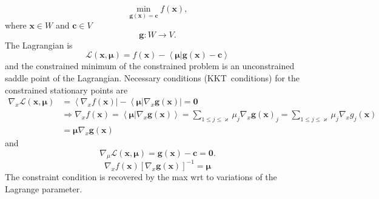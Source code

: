 \documentclass[aps,preprint]{revtex4}%
\begin{document}
\begin{equation}
\min_{\boldsymbol{g}\left(  \boldsymbol{x}\right)  =\boldsymbol{c}}f\left(
\boldsymbol{x}\right)  ,
\end{equation}
where $\boldsymbol{x\in}W$ and $\boldsymbol{c\in}V$
\[
\boldsymbol{g:}W\rightarrow V.
\]
The Lagrangian is%
\begin{equation}
\mathcal{L}\left(  \boldsymbol{x,\mu}\right)  =f\left(  \boldsymbol{x}\right)
-\left\langle \boldsymbol{\mu}\left\vert \boldsymbol{g}\left(  \boldsymbol{x}%
\right)  -\boldsymbol{c}\right.  \right\rangle
\end{equation}
and the constrained minimum of the constrained problem is an unconstrained
saddle point of the Lagrangian. Necessary conditions (KKT\ conditions) for the
constrained stationary points are
\begin{align}
\nabla_{x}\mathcal{L}\left(  \boldsymbol{x,\mu}\right)   &  =\left\langle
\nabla_{x}f\left(  \boldsymbol{x}\right)  \right\vert -\left\langle
\boldsymbol{\mu}\left\vert \nabla_{x}\boldsymbol{g}\left(  \boldsymbol{x}%
\right)  \right.  \right\vert =\boldsymbol{0}\\
&  \Rightarrow\nabla_{x}f\left(  \boldsymbol{x}\right)  =\left\langle
\boldsymbol{\mu}\left\vert \nabla_{x}\boldsymbol{g}\left(  \boldsymbol{x}%
\right)  \right.  \right\rangle =\sum_{1\leq j\leq\varkappa}\mu_{j}\nabla
_{x}\boldsymbol{g}\left(  \boldsymbol{x}\right)  _{j}=\sum_{1\leq
j\leq\varkappa}\mu_{j}\nabla_{x}g_{j}\left(  \boldsymbol{x}\right)  \\
&  =\boldsymbol{\mu}\nabla_{x}\boldsymbol{g}\left(  \boldsymbol{x}\right)
\end{align}
and
\begin{equation}
\nabla_{\mu}\mathcal{L}\left(  \boldsymbol{x,\mu}\right)  =\boldsymbol{g}%
\left(  \boldsymbol{x}\right)  -\boldsymbol{c}=\boldsymbol{0.}%
\end{equation}%
\[
\nabla_{x}f\left(  \boldsymbol{x}\right)  \left[  \nabla_{x}\boldsymbol{g}%
\left(  \boldsymbol{x}\right)  \right]  ^{-1}=\boldsymbol{\mu}%
\]
The constraint condition is recovered by the max wrt to variations of the
Lagrange parameter.
\end{document}
